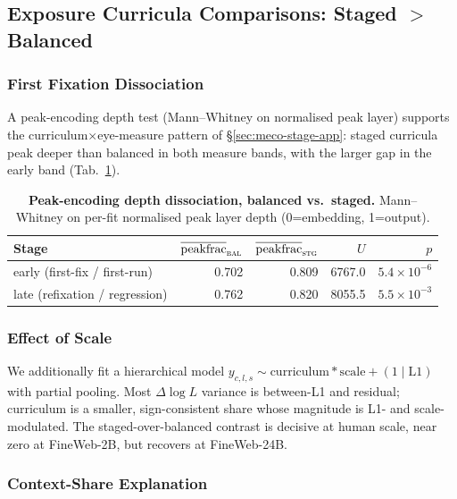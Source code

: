 \subsection{ \beetle{} Exposure Curricula Comparisons: Staged $>$ Balanced}

\subsubsection{First Fixation Dissociation}
A peak-encoding depth test (Mann--Whitney on normalised peak layer) supports the curriculum$\times$eye-measure pattern of \S\ref{sec:meco-stage-app}: staged curricula peak deeper than balanced in both measure bands, with the larger gap in the early band (Tab.~\ref{tab:sig_decomp_dissociation}).

\begin{table}[!ht]
  \centering \small
  \caption{\textbf{Peak-encoding depth dissociation, balanced vs.\ staged.}
  Mann--Whitney on per-fit normalised peak layer depth (0=embedding, 1=output).}
  \label{tab:sig_decomp_dissociation}
  \begin{tabular}{lrrrr}
    \toprule
    Stage & $\overline{\text{peakfrac}}_\textsc{bal}$ & $\overline{\text{peakfrac}}_\textsc{stg}$ & $U$ & $p$ \\
    \midrule
    early (first-fix / first-run)  & 0.702 & 0.809 & 6767.0 & $5.4{\times}10^{-6}$ \\
    late (refixation / regression) & 0.762 & 0.820 & 8055.5 & $5.5{\times}10^{-3}$ \\
    \bottomrule
  \end{tabular}
\end{table}

\subsubsection{Effect of Scale}
We additionally fit a hierarchical model $y_{c,l,s}\sim\mathrm{curriculum}*\mathrm{scale}+(1\mid\mathrm{L1})$ with partial pooling. Most $\Delta\log L$ variance is between-L1 and residual; curriculum is a smaller, sign-consistent share whose magnitude is L1- and scale-modulated. The staged-over-balanced contrast is decisive at human scale,
near zero at FineWeb-2B, but recovers at FineWeb-24B. 


\subsubsection{Context-Share Explanation}

